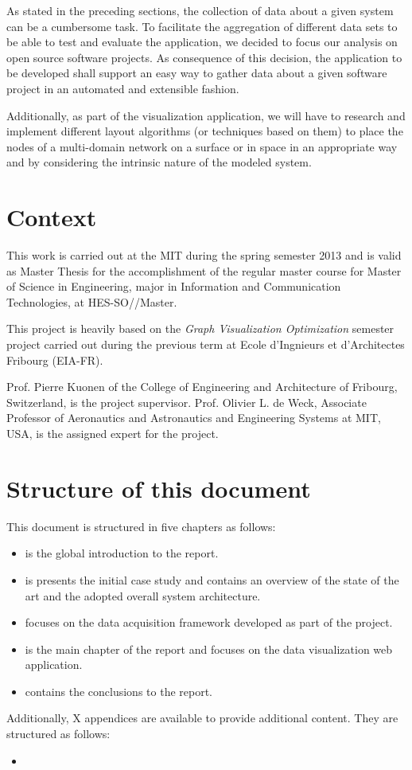 As stated in the preceding sections, the collection of data about a given system can be a cumbersome task. To facilitate the aggregation of different data sets to be able to test and evaluate the application, we decided to focus our analysis on open source software projects. As consequence of this decision, the application to be developed shall support an easy way to gather data about a given software project in an automated and extensible fashion.

Additionally, as part of the visualization application, we will have to research and implement different layout algorithms (or techniques based on them) to place the nodes of a multi-domain network on a surface or in space in an appropriate way and by considering the intrinsic nature of the modeled system.

\section{Context}

This work is carried out at the MIT during the spring semester 2013 and is valid as Master Thesis for the accomplishment of the regular master course for Master of Science in Engineering, major in Information and Communication Technologies, at HES-SO//Master.

This project is heavily based on the \emph{Graph Visualization Optimization} semester project carried out during the previous term at Ecole d'Ingnieurs et d'Architectes Fribourg (EIA-FR).

Prof. Pierre Kuonen of the College of Engineering and Architecture of Fribourg, Switzerland, is the project supervisor. Prof. Olivier L. de Weck, Associate Professor of Aeronautics and Astronautics and Engineering Systems at MIT, USA, is the assigned expert for the project.

\section{Structure of this document}

This document is structured in five chapters as follows:

\begin{itemize}
  \item {} is the global introduction to the report.
  \item {} is presents the initial case study and contains an overview of the state of the art and the adopted overall system architecture.
  \item {} focuses on the data acquisition framework developed as part of the project.
  \item {} is the main chapter of the report and focuses on the data visualization web application.
  \item {} contains the conclusions to the report.
\end{itemize}

Additionally, X appendices are available to provide additional content. They are structured as follows:

\begin{itemize}
  \item {}
\end{itemize}







